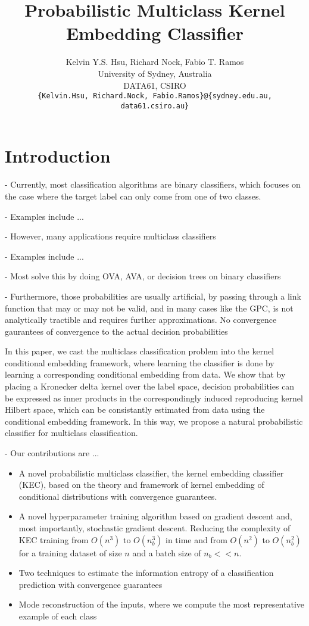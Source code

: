 \documentclass{article}
\title{Probabilistic Multiclass Kernel Embedding Classifier}
\author{
  Kelvin Y.S. Hsu, Richard Nock, Fabio T. Ramos \\
  University of Sydney, Australia\\
  DATA61, CSIRO\\
  \texttt{\{Kelvin.Hsu, Richard.Nock, Fabio.Ramos\}@\{sydney.edu.au, data61.csiro.au\}} \\
}
\begin{document}
\maketitle

\begin{abstract}

\end{abstract}

\section{Introduction}
\label{sec:introduction}

	- Currently, most classification algorithms are binary classifiers, which focuses on the case where the target label can only come from one of two classes. 
	
	- Examples include ...
	
	- However, many applications require multiclass classifiers
	
	- Examples include ...
	
	- Most solve this by doing OVA, AVA, or decision trees on binary classifiers \citep{aly2005survey} 
	
	- Furthermore, those probabilities are usually artificial, by passing through a link function that may or may not be valid, and in many cases like the GPC, is not analytically tractible and requires further approximations. No convergence gaurantees of convergence to the actual decision probabilities
	
	In this paper, we cast the multiclass classification problem into the kernel conditional embedding framework, where learning the classifier is done by learning a corresponding conditional embedding from data. We show that by placing a Kronecker delta kernel over the label space, decision probabilities can be expressed as inner products in the correspondingly induced reproducing kernel Hilbert space, which can be consistantly estimated from data using the conditional embedding framework. In this way, we propose a natural probabilistic classifier for multiclass classification.
	
	- Our contributions are ...
	
	\begin{itemize}
		\item A novel probabilistic multiclass classifier, the kernel embedding classifier (KEC), based on the theory and framework of kernel embedding of conditional distributions with convergence guarantees.
		\item A novel hyperparameter training algorithm based on gradient descent and, most importantly, stochastic gradient descent. Reducing the complexity of KEC training from $O(n^{3})$ to $O(n_{b}^{3})$ in time and from $O(n^{2})$ to $O(n_{b}^{2})$ for a training dataset of size $n$ and a batch size of $n_{b} << n$. 
		\item Two techniques to estimate the information entropy of a classification prediction with convergence guarantees
		\item Mode reconstruction of the inputs, where we compute the most representative example of each class
	\end{itemize}
	
\end{document}

